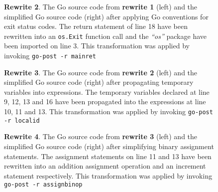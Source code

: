 \begin{figure}[htbp]
	\centering
	\begin{subfigure}[t]{0.45\textwidth}
		
	\end{subfigure}
	\qquad
	\begin{subfigure}[t]{0.45\textwidth}
		
	\end{subfigure}
	\caption{\textbf{Rewrite 2}. The Go source code from \textbf{rewrite 1} (left) and the simplified Go source code (right) after applying Go conventions for exit status codes. The return statement of line 18 have been rewritten into an \texttt{os.Exit} function call and the \textit{``os''} package have been imported on line 3. This transformation was applied by invoking \texttt{go-post -r mainret}}
	\label{fig:rewrite_2}
\end{figure}

\begin{figure}[htbp]
	\centering
	\begin{subfigure}[t]{0.45\textwidth}
		
	\end{subfigure}
	\qquad
	\begin{subfigure}[t]{0.45\textwidth}
		
	\end{subfigure}
	\caption{\textbf{Rewrite 3}. The Go source code from \textbf{rewrite 2} (left) and the simplified Go source code (right) after propagating temporary variables into expressions. The temporary variables declared at line 9, 12, 13 and 16 have been propagated into the expressions at line 10, 11 and 13. This transformation was applied by invoking \texttt{go-post -r localid}}
	\label{fig:rewrite_3}
\end{figure}

\begin{figure}[htbp]
	\centering
	\begin{subfigure}[t]{0.45\textwidth}
		
	\end{subfigure}
	\qquad
	\begin{subfigure}[t]{0.45\textwidth}
		
	\end{subfigure}
	\caption{\textbf{Rewrite 4}. The Go source code from \textbf{rewrite 3} (left) and the simplified Go source code (right) after simplifying binary assignment statements. The assignment statements on line 11 and 13 have been rewritten into an addition assignment operation and an increment statement respectively. This transformation was applied by invoking \texttt{go-post -r assignbinop}}
	\label{fig:rewrite_4}
\end{figure}

